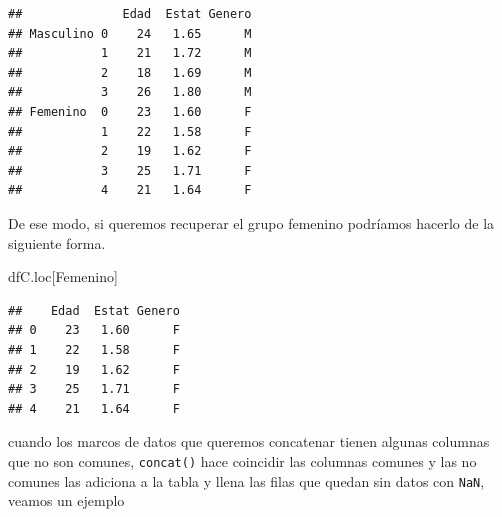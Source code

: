 \documentclass[
]{book}
\newenvironment{Shaded}{\begin{snugshade}}{\end{snugshade}}
\newcommand{\NormalTok}[1]{#1}
\newcommand{\StringTok}[1]{\textcolor[rgb]{0.31,0.60,0.02}{#1}}
\theoremstyle{definition}
\theoremstyle{definition}
\theoremstyle{definition}
\theoremstyle{definition}
\theoremstyle{remark}
\begin{document}
\begin{verbatim}
##              Edad  Estat Genero
## Masculino 0    24   1.65      M
##           1    21   1.72      M
##           2    18   1.69      M
##           3    26   1.80      M
## Femenino  0    23   1.60      F
##           1    22   1.58      F
##           2    19   1.62      F
##           3    25   1.71      F
##           4    21   1.64      F
\end{verbatim}

De ese modo, si queremos recuperar el grupo femenino podríamos hacerlo de la siguiente forma.

\begin{Shaded}
\begin{Highlighting}[]
\NormalTok{dfC.loc[}\StringTok{\textquotesingle{}Femenino\textquotesingle{}}\NormalTok{]}
\end{Highlighting}
\end{Shaded}

\begin{verbatim}
##    Edad  Estat Genero
## 0    23   1.60      F
## 1    22   1.58      F
## 2    19   1.62      F
## 3    25   1.71      F
## 4    21   1.64      F
\end{verbatim}

cuando los marcos de datos que queremos concatenar tienen algunas columnas que no son comunes, \texttt{concat()} hace coincidir las columnas comunes y las no comunes las adiciona a la tabla y llena las filas que quedan sin datos con \texttt{NaN}, veamos un ejemplo
\end{document}
